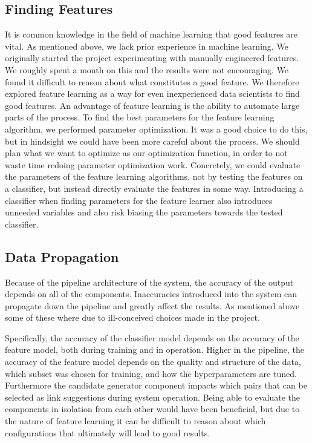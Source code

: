 \subsection{Finding Features}
It is common knowledge in the field of machine learning that good features are vital. As mentioned above, we lack prior experience in machine learning. We originally started the project experimenting with manually engineered features. We roughly spent a month on this and the results were not encouraging. We found it difficult to reason about what constitutes a good feature. We therefore explored feature learning as a way for even inexperienced data scientists to find good features. An advantage of feature learning is the ability to automate large parts of the process. To find the best parameters for the feature learning algorithm, we performed parameter optimization. It was a good choice to do this, but in hindsight we could have been more careful about the process. We should plan what we want to optimize as our optimization function, in order to not waste time redoing parameter optimization work. Concretely, we could evaluate the parameters of the feature learning algorithms, not by testing the features on a classifier, but instead directly evaluate the features in some way. Introducing a classifier when finding parameters for the feature learner also introduces unneeded variables and also risk biasing the parameters towards the tested classifier.

\subsection{Data Propagation}
Because of the pipeline architecture of the system, the accuracy of the output depends on all of the components.
Inaccuracies introduced into the system can propagate down the pipeline and greatly affect the results. As mentioned above some of these where due to ill-conceived choices made in the project.

Specifically, the accuracy of the classifier model depends on the accuracy of the feature model, both during training and in operation. Higher in the pipeline, the accuracy of the feature model depends on the quality and structure of the data, which subset was chosen for training, and how the hyperparameters are tuned. Furthermore the candidate generator component impacts which pairs that can be selected as link suggestions during system operation.
Being able to evaluate the components in isolation from each other would have been beneficial, but due to the nature of feature learning it can be difficult to reason about which configurations that ultimately will lead to good results.

